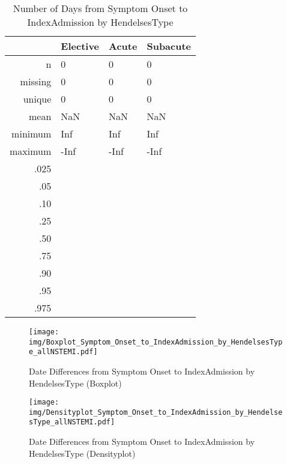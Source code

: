 \documentclass[a4paper]{report}
\begin{document}
\begin{itemize}
{%
\begin{table}[ht]
\centering
\begin{tabular}{rlll}
  \toprule
 & Elective & Acute & Subacute \\ 
  \midrule
n & 0 & 0 & 0 \\ 
  missing & 0 & 0 & 0 \\ 
  unique & 0 & 0 & 0 \\ 
  mean & NaN & NaN & NaN \\ 
  minimum & Inf & Inf & Inf \\ 
  maximum & -Inf & -Inf & -Inf \\ 
  .025 &  &  &  \\ 
  .05 &  &  &  \\ 
  .10 &  &  &  \\ 
  .25 &  &  &  \\ 
  .50 &  &  &  \\ 
  .75 &  &  &  \\ 
  .90 &  &  &  \\ 
  .95 &  &  &  \\ 
  .975 &  &  &  \\ 
   \bottomrule
\end{tabular}
\caption{Number of Days from Symptom Onset to IndexAdmission by HendelsesType} 
\end{table}
\begin{figure}
  \centering
  \caption{Date Differences from Symptom Onset to IndexAdmission by HendelsesType (Boxplot)}
  \label{Boxplot: Date Differences from Symptom Onset to IndexAdmission by HendelsesType}
\texttt{[image: img/Boxplot\_Symptom\_Onset\_to\_IndexAdmission\_by\_HendelsesType\_allNSTEMI.pdf]}\end{figure}


\begin{figure}
  \centering
  \caption{Date Differences from Symptom Onset to IndexAdmission by HendelsesType (Densityplot)}
  \label{Density: Date Differences from Symptom Onset to IndexAdmission by HendelsesType}
\texttt{[image: img/Densityplot\_Symptom\_Onset\_to\_IndexAdmission\_by\_HendelsesType\_allNSTEMI.pdf]}\end{figure}


\clearpage

}
\end{itemize}
\end{document}
